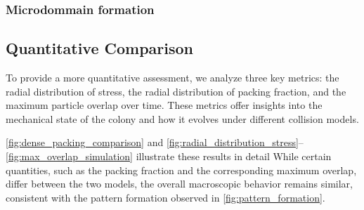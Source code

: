 \documentclass[conference]{IEEEtran}
\begin{document}
\subsubsection{Microdommain formation}

\cite{You2018}


\subsection{Quantitative Comparison}

To provide a more quantitative assessment, we analyze three key metrics: the radial distribution of stress, the radial distribution of packing fraction, and the maximum particle overlap over time. These metrics offer insights into the mechanical state of the colony and how it evolves under different collision models.

\autoref{fig:dense_packing_comparison} and \autoref{fig:radial_distribution_stress}--\autoref{fig:max_overlap_simulation} illustrate these results in detail While certain quantities, such as the packing fraction and the corresponding maximum overlap, differ between the two models, the overall macroscopic behavior remains similar, consistent with the pattern formation observed in \autoref{fig:pattern_formation}.
\end{document}
